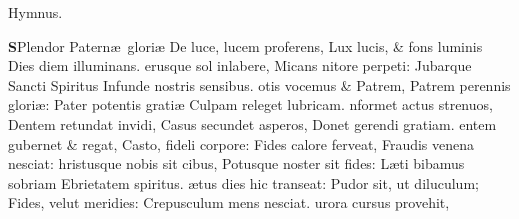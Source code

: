 \documentclass[letter,11pt]{book}
\begin{document}
\begin{multicols*}{2}
\vspace{-.5em} \begin{center} \color{Red} Hymnus. \color{black} \end{center} \vspace{-.5em}
\lettrine[lines=2]{\bfseries \color{Red} S}{}Plendor Patern\ae \ glori\ae 
\newline De luce, lucem proferens,
\newline \indent Lux lucis, \& fons luminis
\newline \indent Dies diem illuminans.
erusque sol inlabere,
\newline \indent Micans nitore perpeti:
\newline \indent Jubarque Sancti Spiritus
\newline \indent Infunde nostris sensibus.
otis vocemus \& Patrem,
\newline \indent Patrem perennis glori\ae :
\newline \indent Pater potentis grati\ae 
\newline \indent Culpam releget lubricam.
nformet actus strenuos,
\newline \indent Dentem retundat invidi,
\newline \indent Casus secundet asperos,
\newline \indent Donet gerendi gratiam.
entem gubernet \& regat,
\newline \indent Casto, fideli corpore:
\newline \indent Fides calore ferveat,
\newline \indent Fraudis venena nesciat:
hristusque nobis sit cibus,
\newline \indent Potusque noster sit fides:
\newline \indent L\ae ti bibamus sobriam
\newline \indent Ebrietatem spiritus.
\ae tus dies hic transeat:
\newline \indent Pudor sit, ut diluculum;
\newline \indent Fides, velut meridies:
\newline \indent Crepusculum mens nesciat.
urora cursus provehit,

\end{multicols*}
\end{document}
